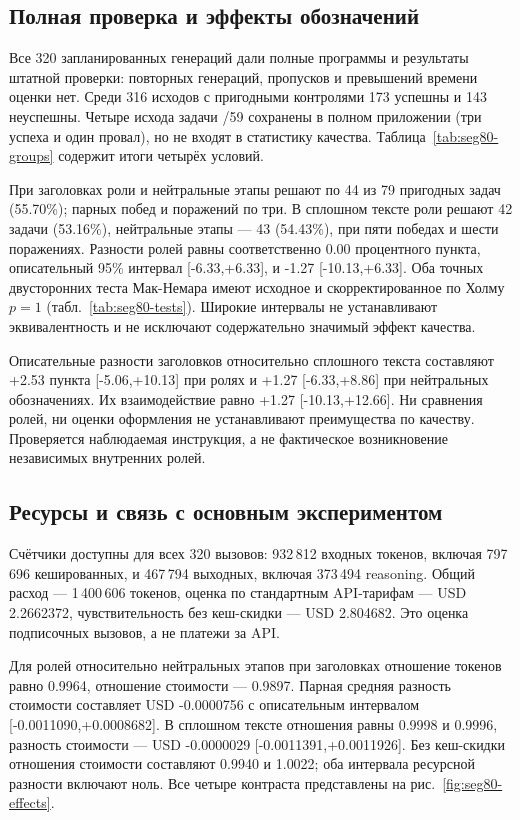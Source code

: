 \subsection{Полная проверка и эффекты обозначений}
Все 320 запланированных генераций дали полные программы и результаты штатной проверки: повторных генераций, пропусков и превышений времени оценки нет. Среди 316 исходов с пригодными контролями 173 успешны и 143 неуспешны. Четыре исхода задачи /59 сохранены в полном приложении (три успеха и один провал), но не входят в статистику качества. Таблица~\ref{tab:seg80-groups} содержит итоги четырёх условий.


При заголовках роли и нейтральные этапы решают по 44 из 79 пригодных задач (55.70\%); парных побед и поражений по три. В сплошном тексте роли решают 42 задачи (53.16\%), нейтральные этапы --- 43 (54.43\%), при пяти победах и шести поражениях. Разности ролей равны соответственно 0.00 процентного пункта, описательный 95\% интервал [-6.33,+6.33], и -1.27 [-10.13,+6.33]. Оба точных двусторонних теста Мак-Немара имеют исходное и скорректированное по Холму $p=1$ (табл.~\ref{tab:seg80-tests}). Широкие интервалы не устанавливают эквивалентность и не исключают содержательно значимый эффект качества.


Описательные разности заголовков относительно сплошного текста составляют +2.53 пункта [-5.06,+10.13] при ролях и +1.27 [-6.33,+8.86] при нейтральных обозначениях. Их взаимодействие равно +1.27 [-10.13,+12.66]. Ни сравнения ролей, ни оценки оформления не устанавливают преимущества по качеству. Проверяется наблюдаемая инструкция, а не фактическое возникновение независимых внутренних ролей.

\subsection{Ресурсы и связь с основным экспериментом}
Счётчики доступны для всех 320 вызовов: 932\,812 входных токенов, включая 797\,696 кешированных, и 467\,794 выходных, включая 373\,494 reasoning. Общий расход --- 1\,400\,606 токенов, оценка по стандартным API-тарифам --- USD 2.2662372, чувствительность без кеш-скидки --- USD 2.804682. Это оценка подписочных вызовов, а не платежи за API.

Для ролей относительно нейтральных этапов при заголовках отношение токенов равно 0.9964, отношение стоимости --- 0.9897. Парная средняя разность стоимости составляет USD -0.0000756 с описательным интервалом [-0.0011090,+0.0008682]. В сплошном тексте отношения равны 0.9998 и 0.9996, разность стоимости --- USD -0.0000029 [-0.0011391,+0.0011926]. Без кеш-скидки отношения стоимости составляют 0.9940 и 1.0022; оба интервала ресурсной разности включают ноль. Все четыре контраста представлены на рис.~\ref{fig:seg80-effects}.

